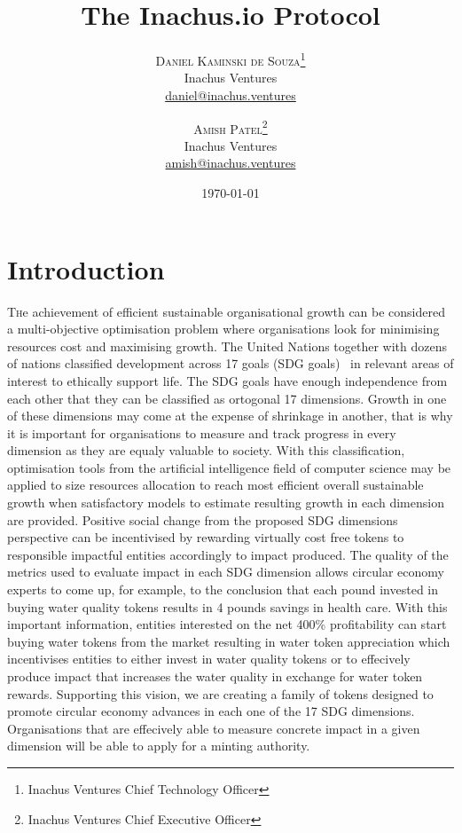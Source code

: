 \documentclass[twoside,twocolumn]{article}
\title{The Inachus.io Protocol} %
\author{
  \textsc{Daniel Kaminski de Souza}\thanks{Inachus Ventures Chief Technology Officer} \\[1ex] %
  \normalsize Inachus Ventures \\ %
  \normalsize \href{mailto:daniel@inachus.ventures}{daniel@inachus.ventures} %
  \and %
  \textsc{Amish Patel}\thanks{Inachus Ventures Chief Executive Officer} \\[1ex] %
  \normalsize Inachus Ventures \\ %
  \normalsize \href{mailto:amish@inachus.ventures}{amish@inachus.ventures} %
}
\date{\today} %
\begin{document}
\maketitle


\section{Introduction}

\lettrine[nindent=0em,lines=3]{T} he achievement of efficient sustainable organisational growth can be considered a multi-objective optimisation problem where organisations look for minimising resources cost and maximising growth. The United Nations together with dozens of nations classified development across 17 goals (SDG goals)~\cite{the_17_sdg_goals} in relevant areas of interest to ethically support life. The SDG goals have enough independence from each other that they can be classified as ortogonal 17 dimensions. Growth in one of these dimensions may come at the expense of shrinkage in another, that is why it is important for organisations to measure and track progress in every dimension as they are equaly valuable to society. With this classification, optimisation tools from the artificial intelligence field of computer science may be applied to size resources allocation to reach most efficient overall sustainable growth when satisfactory models to estimate resulting growth in each dimension are provided. Positive social change from the proposed SDG dimensions perspective can be incentivised by rewarding virtually cost free tokens to responsible impactful entities accordingly to impact produced. The quality of the metrics used to evaluate impact in each SDG dimension allows circular economy experts to come up, for example, to the conclusion that each pound invested in buying water quality tokens results in 4 pounds savings in health care. With this important information, entities interested on the net 400\% profitability can start buying water tokens from the market resulting in water token appreciation which incentivises entities to either invest in water quality tokens or to effecively produce impact that increases the water quality in exchange for water token rewards. Supporting this vision, we are creating a family of tokens designed to promote circular economy advances in each one of the 17 SDG dimensions. Organisations that are effecively able to measure concrete impact in a given dimension will be able to apply for a minting authority.
\end{document}
